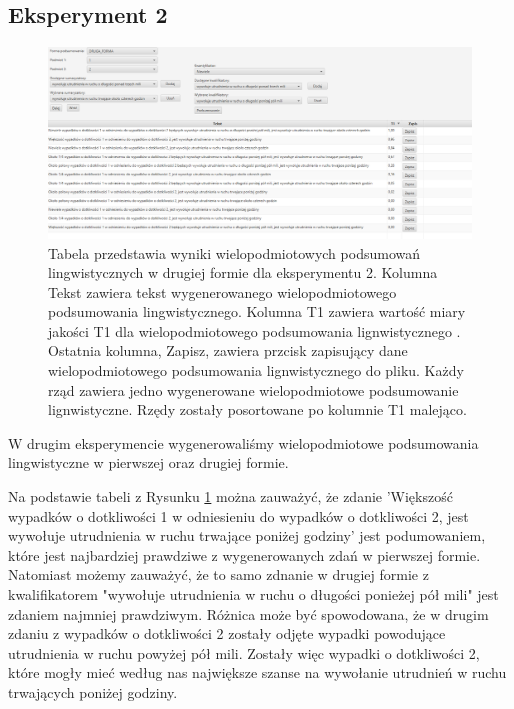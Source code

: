 \documentclass{classrep}
\begin{document}
\newpage
\subsection{Eksperyment 2}
\label{section:ex_wiel2}

\begin{figure}[h!]
 \centering
 \includegraphics[width=15cm]{ex_wiel2.png}
 \vspace{-0.3cm}
 \caption{Tabela przedstawia wyniki wielopodmiotowych podsumowań lingwistycznych w drugiej formie dla eksperymentu 2. Kolumna Tekst zawiera tekst wygenerowanego wielopodmiotowego podsumowania lingwistycznego. Kolumna T1 zawiera wartość miary jakości T1 dla wielopodmiotowego podsumowania lignwistycznego \cite{niewiadomski19}. Ostatnia kolumna, Zapisz, zawiera przcisk zapisujący dane wielopodmiotowego podsumowania lignwistycznego do pliku. Każdy rząd zawiera jedno wygenerowane wielopodmiotowe podsumowanie lignwistyczne. Rzędy zostały posortowane po kolumnie T1 malejąco.  }
 \label{wykr_ex_wiel2}
\end{figure}

W drugim eksperymencie wygenerowaliśmy wielopodmiotowe podsumowania lingwistyczne w pierwszej oraz drugiej formie. 

Na podstawie tabeli z Rysunku \ref{wykr_ex_wiel2} można zauważyć, że zdanie 'Większość wypadków o dotkliwości 1 w odniesieniu do wypadków o dotkliwości 2, jest wywołuje utrudnienia w ruchu trwające poniżej godziny' jest podumowaniem, które jest najbardziej prawdziwe z wygenerowanych zdań w pierwszej formie. Natomiast możemy zauważyć, że to samo zdnanie w drugiej formie z kwalifikatorem "wywołuje utrudnienia w ruchu o długości ponieżej pół mili" jest zdaniem najmniej prawdziwym. Różnica może być spowodowana, że w drugim zdaniu z wypadków o dotkliwości 2 zostały odjęte wypadki powodujące utrudnienia w ruchu powyżej pół mili. Zostały więc wypadki o dotkliwości 2, które mogły mieć według nas największe szanse na wywołanie utrudnień w ruchu trwających poniżej godziny. 
\end{document}
